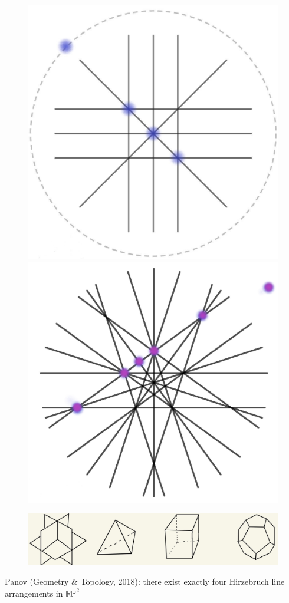 \documentclass{beamer}
\begin{document}
\begin{frame}
\begin{figure}[!h]
		\includegraphics[scale=.1]{Hirzebruch3}
		\includegraphics[scale=.05]{Hirzebruch5}
	\end{figure}
	
	\vspace{-1mm}
	\begin{figure}[!h]
		\includegraphics[scale=.15]{platon}
	\end{figure}
	
	Panov (Geometry \& Topology, 2018): there exist exactly four Hirzebruch line arrangements in \(\mathbb{RP}^2\)
\end{frame}
\end{document}

